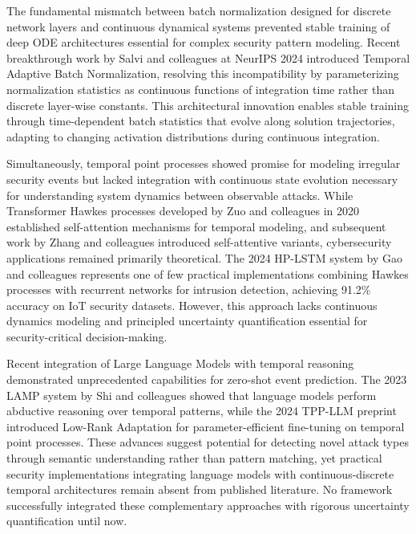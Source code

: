 \documentclass[10pt,journal,compsoc]{IEEEtran}
\begin{document}
The fundamental mismatch between batch normalization designed for discrete network layers and continuous dynamical systems prevented stable training of deep ODE architectures essential for complex security pattern modeling. Recent breakthrough work by Salvi and colleagues at NeurIPS 2024\cite{salvi2024tabn} introduced Temporal Adaptive Batch Normalization, resolving this incompatibility by parameterizing normalization statistics as continuous functions of integration time rather than discrete layer-wise constants. This architectural innovation enables stable training through time-dependent batch statistics that evolve along solution trajectories, adapting to changing activation distributions during continuous integration.

Simultaneously, temporal point processes showed promise for modeling irregular security events but lacked integration with continuous state evolution necessary for understanding system dynamics between observable attacks. While Transformer Hawkes processes developed by Zuo and colleagues in 2020\cite{zuo2020transformer} established self-attention mechanisms for temporal modeling, and subsequent work by Zhang and colleagues introduced self-attentive variants\cite{zhang2020selfatt}, cybersecurity applications remained primarily theoretical. The 2024 HP-LSTM system by Gao and colleagues represents one of few practical implementations combining Hawkes processes with recurrent networks for intrusion detection\cite{gao2024hplstm}, achieving 91.2\% accuracy on IoT security datasets. However, this approach lacks continuous dynamics modeling and principled uncertainty quantification essential for security-critical decision-making.

Recent integration of Large Language Models with temporal reasoning demonstrated unprecedented capabilities for zero-shot event prediction. The 2023 LAMP system by Shi and colleagues showed that language models perform abductive reasoning over temporal patterns\cite{shi2023lamp}, while the 2024 TPP-LLM preprint introduced Low-Rank Adaptation for parameter-efficient fine-tuning on temporal point processes\cite{tpp2024arxiv}. These advances suggest potential for detecting novel attack types through semantic understanding rather than pattern matching, yet practical security implementations integrating language models with continuous-discrete temporal architectures remain absent from published literature. No framework successfully integrated these complementary approaches with rigorous uncertainty quantification until now.
\end{document}
